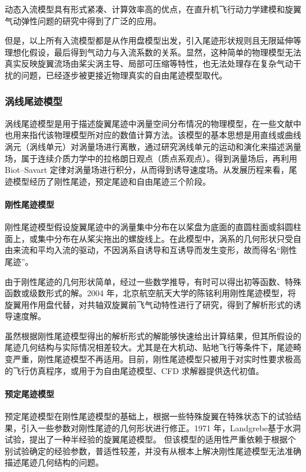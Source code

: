 动态入流模型具有形式紧凑、计算效率高的优点，在直升机飞行动力学建模和旋翼气动弹性问题的研究中得到了广泛的应用。

但是，以上所有入流模型都是从作用盘模型出发，引入尾迹形状规则且无限延伸等理想化假设，最后得到气动力与入流系数的关系。显然，这种简单的物理模型无法真实反映旋翼流场由桨尖涡主导、局部可压缩等特性，也无法处理存在复杂气动干扰的问题，已经逐步被更接近物理真实的自由尾迹模型取代。

\subsubsection{涡线尾迹模型}

涡线尾迹模型是用于描述旋翼尾迹中涡量空间分布情况的物理模型，在一些文献中也用来指代该物理模型所对应的数值计算方法。该模型的基本思想是用直线或曲线涡元（涡线单元）对涡量场进行离散，通过研究涡线单元的运动和演化来描述涡量场，属于连续介质力学中的拉格朗日观点（质点系观点）。得到涡量场后，再利用
Biot–Savart 定律对涡量场进行积分，从而得到诱导速度场。从发展历程来看，尾迹模型经历了刚性尾迹，预定尾迹和自由尾迹三个阶段。

\paragraph{刚性尾迹模型}

刚性尾迹模型假设旋翼尾迹中的涡量集中分布在以桨盘为底面的直圆柱面或斜圆柱面上，或集中分布在从桨尖拖出的螺旋线上。在此模型中，涡系的几何形状只受自由来流和平均入流的驱动，不因涡系自诱导和互诱导而发生变形，故而得名“刚性尾迹”。

由于刚性尾迹的几何形状简单，经过一些数学推导，有时可以得出初等函数、特殊函数或级数形式的解。2004 年，北京航空航天大学的陈铭利用刚性尾迹模型，将旋翼用作用盘代替，对共轴双旋翼前飞气动特性进行了研究，得到了解析形式的诱导速度解。

虽然根据刚性尾迹模型得出的解析形式的解能够快速给出计算结果，但其所假设的尾迹几何结构与实际情况相差较大。尤其是在大机动、贴地飞行等条件下，尾迹畸变严重，刚性尾迹模型不再适用。目前，刚性尾迹模型只被用于对实时性要求极高的飞行仿真程序，或用于为自由尾迹模型、CFD
求解器提供迭代初值。

\paragraph{预定尾迹模型}

预定尾迹模型在刚性尾迹模型的基础上，根据一些特殊旋翼在特殊状态下的试验结果，引入一些参数对刚性尾迹的几何形状进行修正。1971 年，Landgrebe基于水洞试验，提出了一种半经验的旋翼尾迹模型。
但该模型的适用性严重依赖于根据个别试验确定的经验参数，普适性较差，并没有从根本上解决刚性尾迹模型无法准确描述尾迹几何结构的问题。

